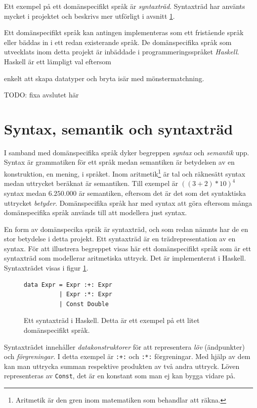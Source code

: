 \begin{draft}
Ett exempel på ett domänspecifikt språk är \textit{syntaxträd}. Syntaxträd har använts mycket i projektet och beskrivs mer utförligt i avsnitt \ref{sec:syntax}.

Ett domänspecifikt språk kan antingen implementeras som ett fristående språk eller bäddas in i ett redan existerande språk. De domänspecifika språk som utvecklats inom detta projekt är inbäddade i programmeringsspråket \textit{Haskell}. Haskell är ett lämpligt val eftersom 

enkelt att skapa datatyper och bryta isär med mönstermatchning. 

TODO: fixa avslutet här

\section{Syntax, semantik och syntaxträd}
\label{sec:syntax}

I samband med domänspecifika språk dyker begreppen \textit{syntax} och \textit{semantik} upp. Syntax är grammatiken för ett språk medan semantiken är betydelsen av en konstruktion, en mening, i språket. Inom aritmetik\footnote{Aritmetik är den gren inom matematiken som behandlar att räkna.} är tal och räknesätt syntax medan uttrycket beräknat är semantiken. Till exempel är $((3 + 2) * 10)^4$ syntax medan $6.250.000$ är semantiken, eftersom det är det som det syntaktiska uttrycket \textit{betyder}. Domänspecifika språk har med syntax att göra eftersom många domänspecifika språk används till att modellera just syntax.

En form av domänspecika språk är syntaxträd, och som redan nämnts har de en stor betydelse i detta projekt. Ett syntaxträd är en trädrepresentation av en syntax. För att illustrera begreppet visas här ett domänspecifikt språk som är ett syntaxträd som modellerar aritmetiska uttryck. Det är implementerat i Haskell. Syntaxträdet visas i figur \ref{fig:syntax_exempel}.

\begin{figure}[tph]
  \begin{lstlisting}
data Expr = Expr :+: Expr
          | Expr :*: Expr
          | Const Double
  \end{lstlisting}
  \caption{Ett syntaxträd i Haskell. Detta är ett exempel på ett litet domänspecifikt språk.}
  \label{fig:syntax_exempel}
\end{figure}

Syntaxträdet innehåller \textit{datakonstruktorer} för att representera \textit{löv} (ändpunkter) och \textit{förgreningar}. I detta exempel är \texttt{:+:} och \texttt{:*:} förgreningar. Med hjälp av dem kan man uttrycka summan respektive produkten av två andra uttryck. Löven representeras av \texttt{Const}, det är en konstant som man ej kan bygga vidare på.


\end{draft}

